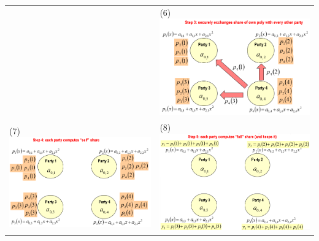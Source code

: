\documentclass{book}
\begin{document}
\begin{tabularx}{0.99\textwidth}{X X}
	 &
	(6)\includegraphics[scale=0.4]{2022-01-02-16-01-46.png}%
	\\
	(7)\includegraphics[scale=0.4]{2022-01-02-16-05-51.png}%
	 &
	(8)\includegraphics[scale=0.4]{2022-01-02-16-06-25.png}%

\end{tabularx}
\end{document}
